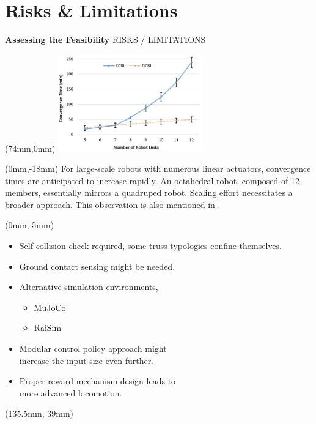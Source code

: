 \documentclass[11pt,aspectratio=169]{beamer}
\begin{document}
\section{Risks \& Limitations}

\begin{frame}[fragile]{\textbf{Assessing the Feasibility} \hfill \fontsize{8}{8}\selectfont RISKS / LIMITATIONS}

        \begin{textblock*}{5cm}(74mm,0mm) %
        \includegraphics[height=42mm]{elements/[15]-Scaling.png}
        \end{textblock*}

        \begin{textblock*}{138mm}(0mm,-18mm)
        For large-scale robots with numerous linear actuators, convergence times are anticipated to increase rapidly. An octahedral robot, composed of 12 members, essentially mirrors a quadruped robot. Scaling effort necessitates a broader approach. This observation is also mentioned in \cite{9981749}.
        \end{textblock*}

        \begin{textblock*}{110mm}(0mm,-5mm)
        \begin{itemize}
            \item Self collision check required, some truss typologies confine themselves.
            \item Ground contact sensing might be needed.
            \item Alternative simulation environments, 
                \begin{itemize}
                    \item MuJoCo
                    \item RaiSim
                \end{itemize}
            \item Modular control policy approach might \\
            increase the input size even further.
            \item Proper reward mechanism design leads to \\
            more advanced locomotion.
        \end{itemize}
        \end{textblock*}

        \begin{textblock*}{5cm}(135.5mm, 39mm) %
        {\tiny \cite{9981749}}
        \end{textblock*}

        \vspace{10mm}

\end{frame}
\end{document}
